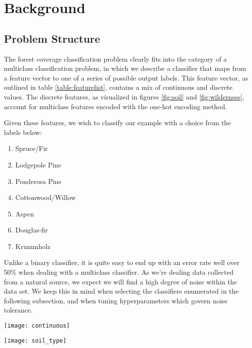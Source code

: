 \section{Background}
\label{sec:-back}
\subsection{Problem Structure}
The forest coverage classification problem clearly fits into the 
category of a multiclass classification problem, in which we describe 
a classifier that maps from a feature vector to one of a series of 
possible output labels.  This feature vector, as outlined in table 
\ref{table:featurelist}, contains a mix of continuous and discrete 
values.  The discrete features, as visualized in figures \ref{fig:soil} 
and \ref{fig:wilderness}, account for multiclass features encoded with 
the one-hot encoding method.  

Given these features, we wish to classify our example with a choice 
from the labels 
below:
\begin{enumerate}
\item Spruce/Fir
\item Lodgepole Pine
\item Ponderosa Pine
\item Cottonwood/Willow
\item Aspen
\item Douglas-fir
\item Krummholz
\end{enumerate}

Unlike a binary classifier, it is quite easy to end up with an 
error rate well over 50\% when dealing with a multiclass 
classifier.  As we're dealing data collected from a natural source, we 
expect we will find a high degree of noise within the data set.  We keep 
this in mind when selecting the classifiers enumerated in the following 
subsection, and when tuning hyperparameters which govern noise 
tolerance.


\begin{figure*}
\centering
\texttt{[image: continuous]}
 \caption{Continuous variables}
 \label{fig:continuous_features}
\end{figure*}

\begin{figure*}
\centering
\texttt{[image: soil\_type]}
 \caption{Soil types and accompanying cover types}
 \label{fig:soil}
\end{figure*}

